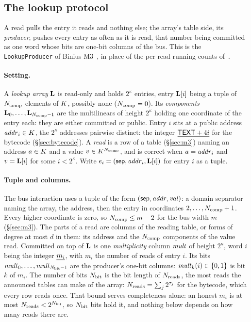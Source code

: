\subsection{The lookup protocol}\label{sec:lookup}

A read pulls the entry it reads and nothing else; the array's table side, its \emph{producer}, pushes every entry as often as it is read, that number being committed as one word whose bits are one-bit columns of the bus. This is the \texttt{LookupProducer} of Binius M3~\cite{m3}, in place of the per-read running counts of~\cite[Protocol~4.27]{DP23}.

\paragraph{Setting.} A \emph{lookup array} $\mathbf{L}$ is read-only and holds $2^{\kappa}$ entries, entry $\mathbf{L}[i]$ being a tuple of $N_{\mathrm{comp}}$ elements of $K$, possibly none ($N_{\mathrm{comp}}=0$). Its \emph{components} $\mathbf{L}_0,\dots,\mathbf{L}_{N_{\mathrm{comp}}-1}$ are the multilinears of height $2^{\kappa}$ holding one coordinate of the entry each: they are either committed or public. Entry $i$ sits at a public address $\mathit{addr}_i\in K$, the $2^{\kappa}$ addresses pairwise distinct: the integer $\underline{\mathsf{TEXT}+4i}$ for the bytecode (\S\ref{sec:bytecode}). A \emph{read} is a row of a table (\S\ref{sec:m3}) naming an address $a\in K$ and a value $v\in K^{N_{\mathrm{comp}}}$, and is correct when $a=\mathit{addr}_i$ and $v=\mathbf{L}[i]$ for some $i<2^{\kappa}$. Write $e_i=( \mathsf{sep},\mathit{addr}_i,\mathbf{L}[i] )$ for entry $i$ as a tuple.

\paragraph{Tuple and columns.} The bus interaction uses a tuple of the form $( \mathsf{sep},\mathit{addr},\mathit{val} )$: a domain separator naming the array, the address, then the entry in coordinates $2,\dots,N_{\mathrm{comp}}+1$. Every higher coordinate is zero, so $N_{\mathrm{comp}}\le m-2$ for the bus width $m$ (\S\ref{sec:m3}). The parts of a read are columns of the reading table, or forms of degree at most $d$ in them: its address and the $N_{\mathrm{comp}}$ components of the value read. Committed on top of $\mathbf{L}$ is one \emph{multiplicity} column $\mathit{mult}$ of height $2^{\kappa}$, word $i$ being the integer $\underline{m_i}$, with $m_i$ the number of reads of entry $i$. Its bits $\mathit{mult}_{0},\dots,\mathit{mult}_{N_{\mathrm{bit}}-1}$ are the producer's one-bit columns: $\mathit{mult}_{k}(i)\in\{0,1\}$ is bit $k$ of $m_i$. The number of bits $N_{\mathrm{bit}}$ is the bit length of $N_{\mathrm{reads}}$, the most reads the announced tables can make of the array: $N_{\mathrm{reads}}=\sum_j2^{\tau_j}$ for the bytecode, which every row reads once. That bound serves completeness alone: an honest $m_i$ is at most $N_{\mathrm{reads}}<2^{N_{\mathrm{bit}}}$, so $N_{\mathrm{bit}}$ bits hold it, and nothing below depends on how many reads there are.

